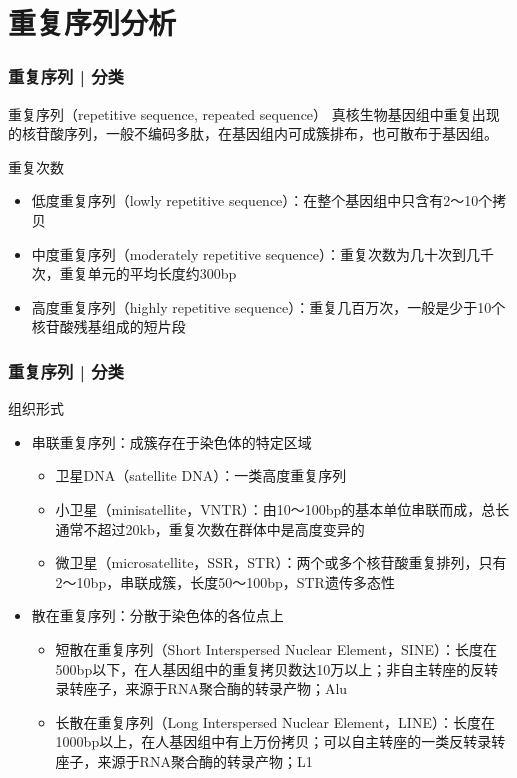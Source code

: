 \section{重复序列分析}
\begin{frame}
	\frametitle{重复序列 | 分类}
	\begin{block}{重复序列（repetitive sequence, repeated sequence）}
		真核生物基因组中重复出现的核苷酸序列，一般不编码多肽，在基因组内可成簇排布，也可散布于基因组。
	\end{block}
	\pause
	\begin{block}{重复次数}
		\begin{itemize}
			\item 低度重复序列（lowly repetitive sequence）：在整个基因组中只含有2～10个拷贝
			\item 中度重复序列（moderately repetitive sequence）：重复次数为几十次到几千次，重复单元的平均长度约300bp
			\item 高度重复序列（highly repetitive sequence）：重复几百万次，一般是少于10个核苷酸残基组成的短片段
		\end{itemize}
	\end{block}
\end{frame}

\begin{frame}
	\frametitle{重复序列 | 分类}
	\begin{block}{组织形式}
		\begin{itemize}
			\item 串联重复序列：成簇存在于染色体的特定区域
				\begin{itemize}
					\item 卫星DNA（satellite DNA）：一类高度重复序列
					\item 小卫星（minisatellite，VNTR）：由10～100bp的基本单位串联而成，总长通常不超过20kb，重复次数在群体中是高度变异的
					\item 微卫星（microsatellite，SSR，STR）：两个或多个核苷酸重复排列，只有2～10bp，串联成簇，长度50～100bp，STR遗传多态性
				\end{itemize}
			\item 散在重复序列：分散于染色体的各位点上
				\begin{itemize}
					\item 短散在重复序列（Short Interspersed Nuclear Element，SINE）：长度在500bp以下，在人基因组中的重复拷贝数达10万以上；非自主转座的反转录转座子，来源于RNA聚合酶的转录产物；Alu
					\item 长散在重复序列（Long Interspersed Nuclear Element，LINE）：长度在1000bp以上，在人基因组中有上万份拷贝；可以自主转座的一类反转录转座子，来源于RNA聚合酶的转录产物；L1
				\end{itemize}
		\end{itemize}
	\end{block}
\end{frame}

